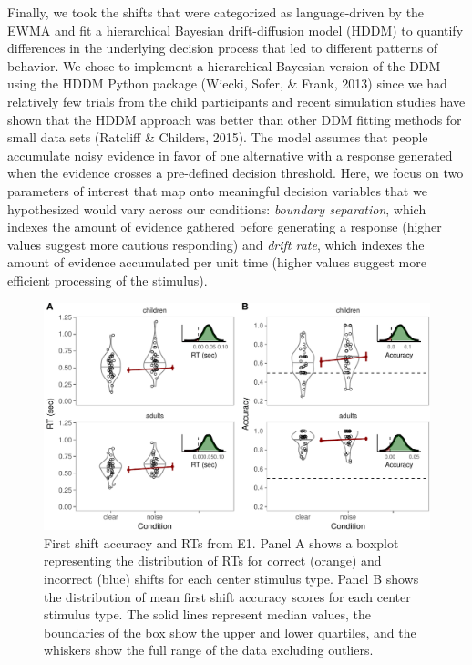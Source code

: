\documentclass[10pt, letterpaper]{article}
\newenvironment{CodeChunk}{}{}
\begin{document}
Finally, we took the shifts that were categorized as language-driven by
the EWMA and fit a hierarchical Bayesian drift-diffusion model (HDDM) to
quantify differences in the underlying decision process that led to
different patterns of behavior. We chose to implement a hierarchical
Bayesian version of the DDM using the HDDM Python package (Wiecki,
Sofer, \& Frank, 2013) since we had relatively few trials from the child
participants and recent simulation studies have shown that the HDDM
approach was better than other DDM fitting methods for small data sets
(Ratcliff \& Childers, 2015). The model assumes that people accumulate
noisy evidence in favor of one alternative with a response generated
when the evidence crosses a pre-defined decision threshold. Here, we
focus on two parameters of interest that map onto meaningful decision
variables that we hypothesized would vary across our conditions:
\emph{boundary separation}, which indexes the amount of evidence
gathered before generating a response (higher values suggest more
cautious responding) and \emph{drift rate}, which indexes the amount of
evidence accumulated per unit time (higher values suggest more efficient
processing of the stimulus).

\begin{CodeChunk}
\begin{figure}[t]

{\centering \includegraphics[width=0.8\linewidth]{figs/noise_acc_rt-1} 

}

\caption[First shift accuracy and RTs from E1]{First shift accuracy and RTs from E1. Panel A shows a boxplot representing the distribution of RTs for correct (orange) and incorrect (blue) shifts for each center stimulus type. Panel B shows the distribution of mean first shift accuracy scores for each center stimulus type. The solid lines represent median values, the boundaries of the box show the upper and lower quartiles, and the whiskers show the full range of the data excluding outliers.}\label{fig:noise_acc_rt}
\end{figure}
\end{CodeChunk}
\end{document}
